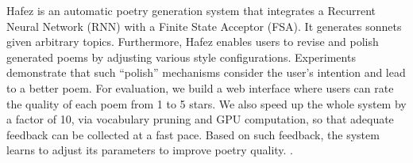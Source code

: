 Hafez is an automatic poetry generation system that integrates a Recurrent Neural Network (RNN) with a Finite State Acceptor (FSA). It generates sonnets given arbitrary topics. Furthermore, Hafez enables users to revise and polish generated poems by adjusting various style configurations. Experiments demonstrate that such ``polish'' mechanisms consider the user's intention and lead to a better poem. For evaluation, we build a web interface where users can rate the quality of each poem from 1 to 5 stars. We also speed up the whole system by a factor of 10, via vocabulary pruning and GPU computation, so that adequate feedback can be collected at a fast pace. Based on such feedback, the system learns to adjust its parameters to improve poetry quality. .
